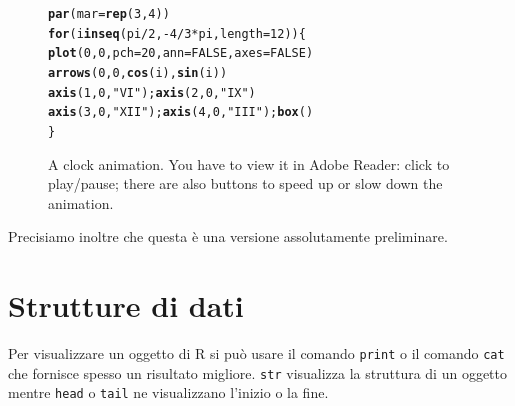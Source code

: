 \documentclass[onecolumn,12pt]{book}\usepackage[]{graphicx}\usepackage[]{color}
\makeatletter
\newcommand{\hlnum}[1]{\textcolor[rgb]{0.686,0.059,0.569}{#1}}%
\newcommand{\hlstr}[1]{\textcolor[rgb]{0.192,0.494,0.8}{#1}}%
\newcommand{\hlopt}[1]{\textcolor[rgb]{0,0,0}{#1}}%
\newcommand{\hlstd}[1]{\textcolor[rgb]{0.345,0.345,0.345}{#1}}%
\newcommand{\hlkwa}[1]{\textcolor[rgb]{0.161,0.373,0.58}{\textbf{#1}}}%
\newcommand{\hlkwc}[1]{\textcolor[rgb]{0.333,0.667,0.333}{#1}}%
\newcommand{\hlkwd}[1]{\textcolor[rgb]{0.737,0.353,0.396}{\textbf{#1}}}%
\newenvironment{kframe}{%
 \def\at@end@of@kframe{}%
 \ifinner\ifhmode%
  \def\at@end@of@kframe{\end{minipage}}%
  \begin{minipage}{\columnwidth}%
 \fi\fi%
 \def\FrameCommand##1{\hskip\@totalleftmargin \hskip-\fboxsep
 \colorbox{shadecolor}{##1}\hskip-\fboxsep
     \hskip-\linewidth \hskip-\@totalleftmargin \hskip\columnwidth}%
 \MakeFramed {\advance\hsize-\width
   \@totalleftmargin\z@ \linewidth\hsize
   \@setminipage}}%
 {\par\unskip\endMakeFramed%
 \at@end@of@kframe}
\newenvironment{knitrout}{}{} %
\makeatother
\begin{document}
\begin{figure}
\begin{knitrout}
\color{fgcolor}\begin{kframe}
\begin{alltt}
\hlkwd{par}\hlstd{(}\hlkwc{mar} \hlstd{=} \hlkwd{rep}\hlstd{(}\hlnum{3}\hlstd{,} \hlnum{4}\hlstd{))}
\hlkwa{for} \hlstd{(i} \hlkwa{in} \hlkwd{seq}\hlstd{(pi}\hlopt{/}\hlnum{2}\hlstd{,} \hlopt{-}\hlnum{4}\hlopt{/}\hlnum{3} \hlopt{*} \hlstd{pi,} \hlkwc{length} \hlstd{=} \hlnum{12}\hlstd{)) \{}
    \hlkwd{plot}\hlstd{(}\hlnum{0}\hlstd{,} \hlnum{0}\hlstd{,} \hlkwc{pch} \hlstd{=} \hlnum{20}\hlstd{,} \hlkwc{ann} \hlstd{=} \hlnum{FALSE}\hlstd{,} \hlkwc{axes} \hlstd{=} \hlnum{FALSE}\hlstd{)}
    \hlkwd{arrows}\hlstd{(}\hlnum{0}\hlstd{,} \hlnum{0}\hlstd{,} \hlkwd{cos}\hlstd{(i),} \hlkwd{sin}\hlstd{(i))}
    \hlkwd{axis}\hlstd{(}\hlnum{1}\hlstd{,} \hlnum{0}\hlstd{,} \hlstr{"VI"}\hlstd{);} \hlkwd{axis}\hlstd{(}\hlnum{2}\hlstd{,} \hlnum{0}\hlstd{,} \hlstr{"IX"}\hlstd{)}
    \hlkwd{axis}\hlstd{(}\hlnum{3}\hlstd{,} \hlnum{0}\hlstd{,} \hlstr{"XII"}\hlstd{);} \hlkwd{axis}\hlstd{(}\hlnum{4}\hlstd{,} \hlnum{0}\hlstd{,} \hlstr{"III"}\hlstd{);} \hlkwd{box}\hlstd{()}
\hlstd{\}}
\end{alltt}
\end{kframe}












{\centering {}

}



\end{knitrout}

\caption{A clock animation. You have to view it in Adobe Reader: click to play/pause;
there are also buttons to speed up or slow down the animation.\label{fig:clock-animation}}
\end{figure}

Precisiamo inoltre che questa \`e una versione assolutamente preliminare.
\chapter{Strutture di dati}

 
Per visualizzare un oggetto di \textsf{R} si pu\`o usare il comando \texttt{print} o il comando \texttt{cat} che fornisce spesso un risultato migliore. \texttt{str} visualizza la struttura di un oggetto mentre \texttt{head} o \texttt{tail} ne visualizzano l'inizio o la fine.
\end{document}
